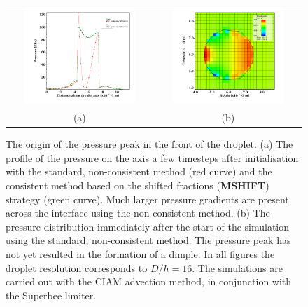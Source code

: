 \begin{figure}
\begin{center}
\begin{tabular}{cc}
\hspace*{-1.0cm}
\includegraphics[width=0.8\textwidth]{plots/raindrop/pressure_compare.png} &
\hspace{-0.4cm}%
\includegraphics[width=0.8\textwidth]{plots/raindrop/nonmc_16ppd_pressure.png}\\
\hspace{-0.8cm}%
(a) & (b)
\end{tabular}
\end{center}
\caption{The origin of the pressure peak in the front of the droplet. 
(a) The profile of the pressure on the axis a few timesteps after initialisation 
with the standard, non-consistent method (red curve) and the consistent method based
on the shifted fractions (\textbf{MSHIFT}) strategy (green curve). 
Much larger pressure gradients are present across the interface using the non-consistent method. 
(b) The pressure distribution immediately after the start of the simulation 
using the standard, non-consistent method. The pressure peak has not yet resulted
in the formation of a dimple. In all figures the droplet resolution corresponds to $D/h = 16$.
The simulations are carried out with the CIAM advection method, in conjunction with the Superbee limiter.}
\label{pressure_1}
\end{figure}

